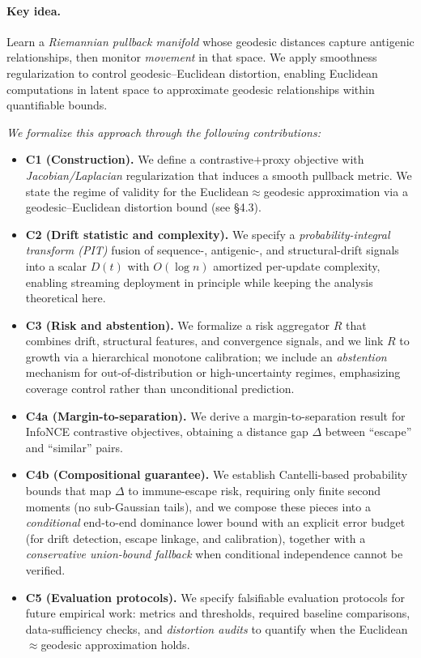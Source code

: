 \documentclass[11pt]{article}
\begin{document}
\paragraph{Key idea.}
Learn a \emph{Riemannian pullback manifold} whose geodesic distances capture antigenic relationships, then monitor \emph{movement} in that space. We apply smoothness regularization to control geodesic–Euclidean distortion, enabling Euclidean computations in latent space to approximate geodesic relationships within quantifiable bounds.

\noindent \textit{We formalize this approach through the following contributions:}

\begin{itemize}
  \item \textbf{C1 (Construction).} We define a contrastive$+$proxy objective with \emph{Jacobian/Laplacian} regularization that induces a smooth pullback metric. We state the regime of validity for the Euclidean$\approx$geodesic approximation via a geodesic–Euclidean distortion bound (see §4.3).
  \item \textbf{C2 (Drift statistic and complexity).} We specify a \emph{probability-integral transform (PIT)} fusion of sequence-, antigenic-, and structural-drift signals into a scalar $D(t)$ with $O(\log n)$ amortized per-update complexity, enabling streaming deployment in principle while keeping the analysis theoretical here.
  \item \textbf{C3 (Risk and abstention).} We formalize a risk aggregator $R$ that combines drift, structural features, and convergence signals, and we link $R$ to growth via a hierarchical monotone calibration; we include an \emph{abstention} mechanism for out-of-distribution or high-uncertainty regimes, emphasizing coverage control rather than unconditional prediction.
  \item \textbf{C4a (Margin-to-separation).} We derive a margin-to-separation result for InfoNCE contrastive objectives, obtaining a distance gap $\Delta$ between “escape” and “similar” pairs.
  \item \textbf{C4b (Compositional guarantee).} We establish Cantelli-based probability bounds that map $\Delta$ to immune-escape risk, requiring only finite second moments (no sub-Gaussian tails), and we compose these pieces into a \emph{conditional} end-to-end dominance lower bound with an explicit error budget (for drift detection, escape linkage, and calibration), together with a \emph{conservative union-bound fallback} when conditional independence cannot be verified.
  \item \textbf{C5 (Evaluation protocols).} We specify falsifiable evaluation protocols for future empirical work: metrics and thresholds, required baseline comparisons, data-sufficiency checks, and \emph{distortion audits} to quantify when the Euclidean$\approx$geodesic approximation holds.
\end{itemize}
\end{document}
